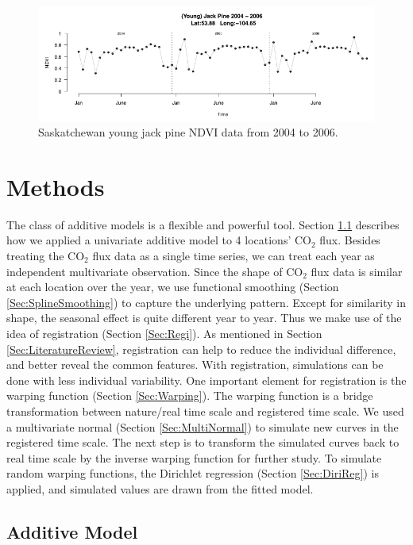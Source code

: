 \documentclass{article}
\begin{document}
\begin{figure}[!ht]
\centering
\includegraphics[width=14cm]{yjpndvi.png}
\caption{Saskatchewan young jack pine NDVI data from 2004 to 2006.}
\label{Fig:yjpndvi}
\end{figure}

\section{Methods}\label{Sec:Methods}

The class of additive models is a flexible and powerful tool. Section \ref{Sec:AddModel} describes how we applied a univariate additive model to 4 locations' CO$_2$ flux. Besides treating the CO$_2$ flux data as a single time series, we can treat each year as independent multivariate observation. Since the shape of CO$_2$ flux data is similar at each location over the year, we use functional smoothing (Section \ref{Sec:SplineSmoothing}) to capture the underlying pattern.  Except for similarity in shape, the seasonal effect is quite different year to year. Thus we make use of the idea of registration (Section \ref{Sec:Regi}). As mentioned in Section \ref{Sec:LiteratureReview}, registration can help to reduce the individual difference, and better reveal the common features. With registration, simulations can be done with less individual variability. One important element for registration is the warping function (Section \ref{Sec:Warping}). The warping function is a bridge transformation between nature/real time scale and registered time scale. We used a multivariate normal (Section \ref{Sec:MultiNormal}) to simulate new curves in the registered time scale. The next step is to transform the simulated curves back to real time scale by the inverse warping function for further study.  To simulate random warping functions, the Dirichlet regression (Section \ref{Sec:DiriReg}) is applied, and simulated values are drawn from the fitted model.

\subsection{Additive Model}\label{Sec:AddModel}
\end{document}
